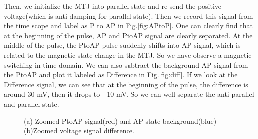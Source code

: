 Then, we initialize the MTJ into parallel state and re-send the positive voltage(which is anti-damping for parallel state). Then we record this signal from the time scope and label as P to AP in Fig.\ref{fig:APtoP}. One can clearly find that at the beginning of the pulse, AP and PtoAP signal are clearly separated. At the middle of the pulse, the PtoAP pulse suddenly shifts into AP signal, which is related to the magnetic state change in the MTJ. So we have observe a magnetic switching in time-domain. We can also subtract the background AP signal from the PtoAP and plot it labeled as Difference in Fig.\ref{fig:diff}. If we look at the Difference signal, we can see that at the beginning of the pulse, the difference is around 30 mV, then it drops to - 10 mV. So we can well separate the anti-parallel and parallel state.

\begin{figure}[!ht]
\centering
{}
\caption{(a) Zoomed PtoAP signal(red) and AP state background(blue) (b)Zoomed voltage signal difference.}
\end{figure}

